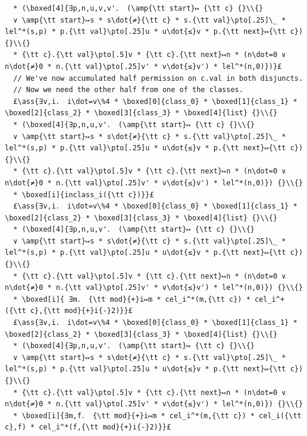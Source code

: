 \documentclass[12pt,a4paper]{article}
\makeatletter
\newcommand{\ml}[2][t]{\mbox{\mdseries\begin{tabular}[#1]{@{}L@{}}#2\end{tabular}}}
\newcommand{\ass}[1]{\ensuremath{{\color{blue}\left\{\ml[c]{#1}\right\}}}}
\makeatother
\begin{document}
\begin{lstlisting}
  * (\boxed[4]{∃p,n,u,v,v'． (\amp{\tt start}↦ {\tt c} {}\\{}
  ∨ \amp{\tt start}↦s * s\dot{≠}{\tt c} * s.{\tt val}\pto[.25]\_ * lel^*(s,p) * p.{\tt val}\pto[.25]u * u\dot{≤}v * p.{\tt next}↦{\tt c}) {}\\{}
  * {\tt c}.{\tt val}\pto[.5]v * {\tt c}.{\tt next}↦n * (n\dot=0 ∨ n\dot{≠}0 * n.{\tt val}\pto[.25]v' * v\dot{≤}v') * lel^*(n,0)})}£
  // We've now accumulated half permission on c.val in both disjuncts. 
  // Now we need the other half from one of the classes.
  £\ass{∃v,i． i\dot=v\%4 * \boxed[0]{class_0} * \boxed[1]{class_1} * \boxed[2]{class_2} * \boxed[3]{class_3} * \boxed[4]{list} {}\\{}
  * (\boxed[4]{∃p,n,u,v'． (\amp{\tt start}↦ {\tt c} {}\\{}
  ∨ \amp{\tt start}↦s * s\dot{≠}{\tt c} * s.{\tt val}\pto[.25]\_ * lel^*(s,p) * p.{\tt val}\pto[.25]u * u\dot{≤}v * p.{\tt next}↦{\tt c}) {}\\{}
  * {\tt c}.{\tt val}\pto[.5]v * {\tt c}.{\tt next}↦n * (n\dot=0 ∨ n\dot{≠}0 * n.{\tt val}\pto[.25]v' * v\dot{≤}v') * lel^*(n,0)}) {}\\{}
  * \boxed[i]{inclass_i({\tt c})}}£
  £\ass{∃v,i． i\dot=v\%4 * \boxed[0]{class_0} * \boxed[1]{class_1} * \boxed[2]{class_2} * \boxed[3]{class_3} * \boxed[4]{list} {}\\{}
  * (\boxed[4]{∃p,n,u,v'． (\amp{\tt start}↦ {\tt c} {}\\{}
  ∨ \amp{\tt start}↦s * s\dot{≠}{\tt c} * s.{\tt val}\pto[.25]\_ * lel^*(s,p) * p.{\tt val}\pto[.25]u * u\dot{≤}v * p.{\tt next}↦{\tt c}) {}\\{}
  * {\tt c}.{\tt val}\pto[.5]v * {\tt c}.{\tt next}↦n * (n\dot=0 ∨ n\dot{≠}0 * n.{\tt val}\pto[.25]v' * v\dot{≤}v') * lel^*(n,0)}) {}\\{}
  * \boxed[i]{ ∃m． {\tt mod}{+}i↦m * cel_i^*(m,{\tt c}) * cel_i^+({\tt c},{\tt mod}{+}i{-}2)}}£
  £\ass{∃v,i． i\dot=v\%4 * \boxed[0]{class_0} * \boxed[1]{class_1} * \boxed[2]{class_2} * \boxed[3]{class_3} * \boxed[4]{list} {}\\{}
  * (\boxed[4]{∃p,n,u,v'． (\amp{\tt start}↦ {\tt c} {}\\{}
  ∨ \amp{\tt start}↦s * s\dot{≠}{\tt c} * s.{\tt val}\pto[.25]\_ * lel^*(s,p) * p.{\tt val}\pto[.25]u * u\dot{≤}v * p.{\tt next}↦{\tt c}) {}\\{}
  * {\tt c}.{\tt val}\pto[.5]v * {\tt c}.{\tt next}↦n * (n\dot=0 ∨ n\dot{≠}0 * n.{\tt val}\pto[.25]v' * v\dot{≤}v') * lel^*(n,0)}) {}\\{}
  * \boxed[i]{∃m,f． {\tt mod}{+}i↦m * cel_i^*(m,{\tt c}) * cel_i({\tt c},f) * cel_i^*(f,{\tt mod}{+}i{-}2)}}£

\end{lstlisting}
\end{document}
